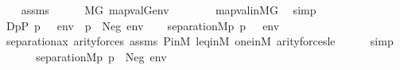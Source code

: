 \begin{isabellebody}
\ \ \isamarkupfalse%
\ assms\ \isanewline
\ \ \isamarkupfalse%
\ {\isachardoublequoteopen}{\isasymnot}\ {\isacharparenleft}{\kern0pt}M{\isacharbrackleft}{\kern0pt}G{\isacharbrackright}{\kern0pt}{\isacharcomma}{\kern0pt}\ map{\isacharparenleft}{\kern0pt}val{\isacharparenleft}{\kern0pt}G{\isacharparenright}{\kern0pt}{\isacharcomma}{\kern0pt}env{\isacharparenright}{\kern0pt}\ {\isasymTurnstile}\ {\isasymphi}{\isacharparenright}{\kern0pt}{\isachardoublequoteclose}\isanewline
\ \ \ \ \isamarkupfalse%
\ map{\isacharunderscore}{\kern0pt}val{\isacharunderscore}{\kern0pt}in{\isacharunderscore}{\kern0pt}MG\ \isamarkupfalse%
\ simp\isanewline
\ \ \isamarkupfalse%
\ {\isacharquery}{\kern0pt}D{\isacharequal}{\kern0pt}{\isachardoublequoteopen}{\isacharbraceleft}{\kern0pt}p{\isasymin}P{\isachardot}{\kern0pt}\ {\isacharparenleft}{\kern0pt}p\ {\isasymtturnstile}\ {\isasymphi}\ env{\isacharparenright}{\kern0pt}\ {\isasymor}\ {\isacharparenleft}{\kern0pt}p\ {\isasymtturnstile}\ Neg{\isacharparenleft}{\kern0pt}{\isasymphi}{\isacharparenright}{\kern0pt}\ env{\isacharparenright}{\kern0pt}{\isacharbraceright}{\kern0pt}{\isachardoublequoteclose}\isanewline
\ \ \isamarkupfalse%
\ {\isachardoublequoteopen}separation{\isacharparenleft}{\kern0pt}{\isacharhash}{\kern0pt}{\isacharhash}{\kern0pt}M{\isacharcomma}{\kern0pt}{\isasymlambda}p{\isachardot}{\kern0pt}\ {\isacharparenleft}{\kern0pt}p\ {\isasymtturnstile}\ {\isasymphi}\ env{\isacharparenright}{\kern0pt}{\isacharparenright}{\kern0pt}{\isachardoublequoteclose}\ \isanewline
\ \ \ \ \ \ \isamarkupfalse%
\ separation{\isacharunderscore}{\kern0pt}ax\ arity{\isacharunderscore}{\kern0pt}forces\ assms\ P{\isacharunderscore}{\kern0pt}in{\isacharunderscore}{\kern0pt}M\ leq{\isacharunderscore}{\kern0pt}in{\isacharunderscore}{\kern0pt}M\ one{\isacharunderscore}{\kern0pt}in{\isacharunderscore}{\kern0pt}M\ arity{\isacharunderscore}{\kern0pt}forces{\isacharunderscore}{\kern0pt}le\isanewline
\ \ \ \ \isamarkupfalse%
\ simp\isanewline
\ \ \isamarkupfalse%
\isanewline
\ \ \isamarkupfalse%
\ {\isachardoublequoteopen}separation{\isacharparenleft}{\kern0pt}{\isacharhash}{\kern0pt}{\isacharhash}{\kern0pt}M{\isacharcomma}{\kern0pt}{\isasymlambda}p{\isachardot}{\kern0pt}\ {\isacharparenleft}{\kern0pt}p\ {\isasymtturnstile}\ Neg{\isacharparenleft}{\kern0pt}{\isasymphi}{\isacharparenright}{\kern0pt}\ env{\isacharparenright}{\kern0pt}{\isacharparenright}{\kern0pt}{\isachardoublequoteclose}\isanewline

\end{isabellebody}
